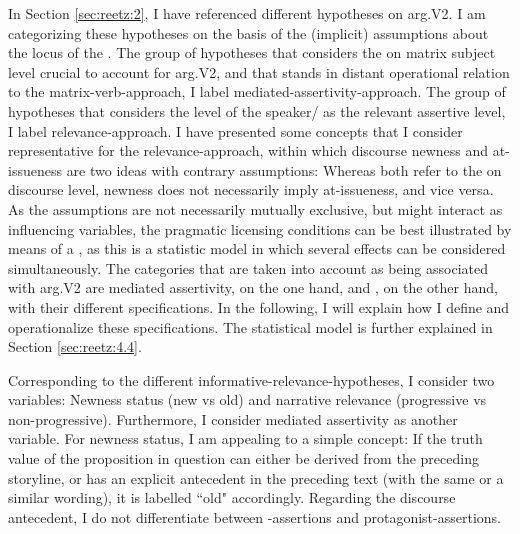 \documentclass[output=paper,colorlinks,citecolor=brown]{langscibook}
\begin{document}
In Section \ref{sec:reetz:2}, I have referenced different hypotheses on arg.V2. I am categorizing these hypotheses on the basis of the (implicit) assumptions about the locus of the . The group of hypotheses that considers the  on matrix subject level crucial to account for arg.V2, and that stands in distant operational relation to the matrix-verb-approach, I label mediated-assertivity-approach. The group of hypotheses that considers the level of the speaker/\linebreak[4] as the relevant assertive level, I label relevance-approach. I have presented some concepts that I consider representative for the relevance-approach, within which discourse newness \citep{Meinunger2006} and at-issueness \citep{Antomo2016} are two ideas with contrary assumptions: Whereas both refer to the  on discourse level, newness does not necessarily imply at-issueness, and vice versa. As the assumptions are not necessarily mutually exclusive, but might interact as influencing variables, the pragmatic licensing conditions can be best illustrated by means of a , as this is a statistic model in which several effects can be considered simultaneously. The categories that are taken into account as being associated with arg.V2 are mediated assertivity, on the one hand, and , on the other hand, with their different specifications. In the following, I will explain how I define and operationalize these specifications. The statistical model is further explained in Section \ref{sec:reetz:4.4}.

Corresponding to the different informative-relevance-hypotheses, I consider two variables: Newness status (new vs old) and narrative relevance (progressive vs non-progressive). Furthermore, I consider mediated assertivity as another variable. For newness status, I am appealing to a simple concept: If the truth value of the proposition in question can either be derived from the preceding storyline, or has an explicit antecedent in the preceding text (with the same or a similar wording), it is labelled “old" accordingly. Regarding the discourse antecedent, I do not differentiate between -assertions and protagonist-assertions.
\end{document}
